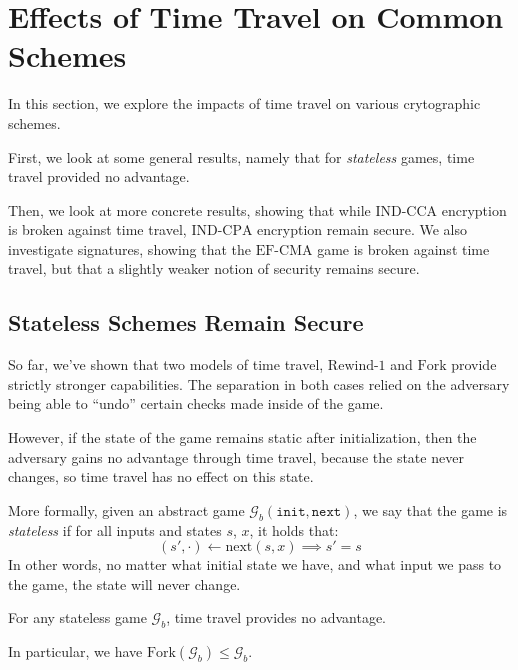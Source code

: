 \section{Effects of Time Travel on Common Schemes}

In this section, we explore the impacts of time travel on various
crytographic schemes.

First, we look at some general results, namely that for \emph{stateless}
games, time travel provided no advantage.

Then, we look at more concrete results, showing that while $\text{IND-CCA}$
encryption is broken against time travel, $\text{IND-CPA}$ encryption
remain secure.
We also investigate signatures, showing that the $\text{EF-CMA}$
game is broken against time travel, but that a slightly weaker notion
of security remains secure.

\subsection{Stateless Schemes Remain Secure}

So far, we've shown that two models of time travel, $\text{Rewind-1}$
and $\text{Fork}$ provide strictly stronger capabilities.
The separation in both cases relied on the adversary being able to
``undo'' certain checks made inside of the game.

However, if the state of the game remains static after initialization,
then the adversary gains no advantage through time travel,
because the state never changes, so time travel has no effect on this
state.

More formally, given an abstract game $\mathcal{G}_b(\texttt{init}, \texttt{next})$,
we say that the game is \emph{stateless} if for all inputs and states $s$, $x$, it holds that:
$$
(s', \cdot) \gets \text{next}(s, x) \implies s' = s
$$
In other words, no matter what initial state we have, and what input
we pass to the game, the state will never change.

\begin{claim}
\label{claim:stateless-games}
For any stateless game $\mathcal{G}_b$, time travel provides no advantage.

In particular, we have $\text{Fork}(\mathcal{G}_b) \leq \mathcal{G}_b$.
\end{claim}

